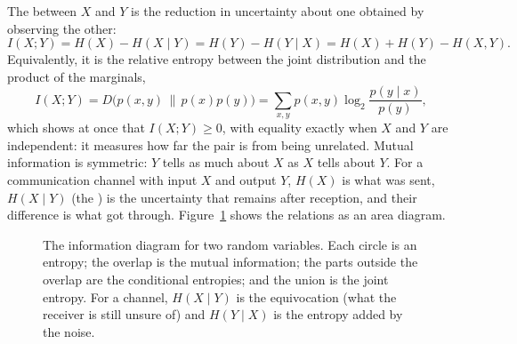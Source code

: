 The  between $X$ and $Y$ is the reduction in uncertainty about one
obtained by observing the other:
\begin{equation}
I(X;Y)=H(X)-H(X\mid Y)=H(Y)-H(Y\mid X)=H(X)+H(Y)-H(X,Y).
\label{eq:ch13:mi}
\end{equation}
Equivalently, it is the relative entropy between the joint distribution and the product of the
marginals,
\begin{equation}
I(X;Y)=D\big(p(x,y)\,\|\,p(x)p(y)\big)=\sum_{x,y}p(x,y)\log_2\frac{p(y\mid x)}{p(y)},
\label{eq:ch13:mikl}
\end{equation}
which shows at once that $I(X;Y)\ge0$, with equality exactly when $X$ and $Y$ are independent: it
measures how far the pair is from being unrelated. Mutual information is symmetric: $Y$ tells as
much about $X$ as $X$ tells about $Y$. For a communication channel with input $X$ and output $Y$,
$H(X)$ is what was sent, $H(X\mid Y)$ (the ) is the uncertainty that remains
after reception, and their difference is what got through. Figure~\ref{fig:ch13_venn} shows the
relations as an area diagram.

\begin{figure}[htbp]\centering
{}
\caption{The information diagram for two random variables. Each circle is an entropy; the overlap
is the mutual information; the parts outside the overlap are the conditional entropies; and the
union is the joint entropy. For a channel, $H(X\mid Y)$ is the equivocation (what the receiver is
still unsure of) and $H(Y\mid X)$ is the entropy added by the noise.}
\label{fig:ch13_venn}
\end{figure}

